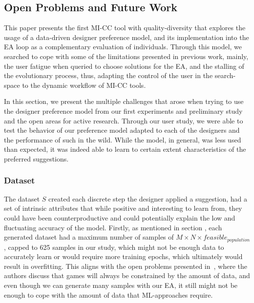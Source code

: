 \subsection{Open Problems and Future Work}


 
This paper presents the first MI-CC tool with quality-diversity that explores the usage of a data-driven designer preference model, and its implementation into the EA loop as a complementary evaluation of individuals. Through this model, we searched to cope with some of the limitations presented in previous work, mainly, the user fatigue when queried to choose solutions for the EA, and the stalling of the evolutionary process, thus, adapting the control of the user in the search-space to the dynamic workflow of MI-CC tools. 

In this section, we present the multiple challenges that arose when trying to use the designer preference model from our first experiments and preliminary study and the open areas for active research. Through our user study, we were able to test the behavior of our preference model adapted to each of the designers and the performance of such in the wild. While the model, in general, was less used than expected, it was indeed able to learn to certain extent characteristics of the preferred suggestions. 

\subsubsection{Dataset}

The dataset $S$ created each discrete step the designer applied a suggestion, had a set of intrinsic attributes that while positive and interesting to learn from, they could have been counterproductive and could potentially explain the low and fluctuating accuracy of the model. Firstly, as mentioned in section , each generated dataset had a maximum number of samples of $M \times N \times feasible_{population}$, capped to 625 samples in our study, which might not be enough data to accurately learn or would require more training epochs, which ultimately would result in overfitting. This aligns with the open problems presented in~, where the authors discuss that games will always be constrained by the amount of data, and even though we can generate many samples with our EA, it still might not be enough to cope with the amount of data that ML-approaches require.

